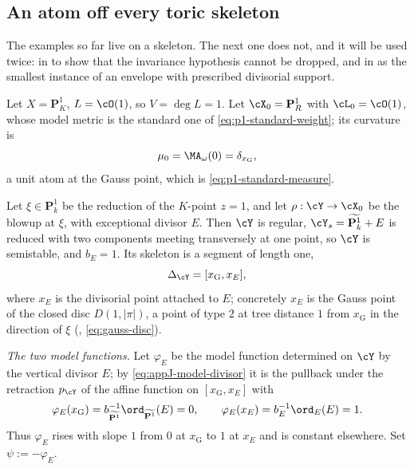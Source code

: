 \subsection{An atom off every toric skeleton}
\label{sec:ch31-p1-blowup}

The examples so far live on a skeleton.  The next one does not, and it will
be used twice: in  to show that the invariance
hypothesis cannot be dropped, and in  as the
smallest instance of an envelope with prescribed divisorial support.

\begin{example}
\label{ex:ch31-p1-blowup}
Let \(X=\mathbf P^1_K\), \(L=\cO(1)\), so \(V=\deg L=1\).  Let
\(\cX_0=\mathbf P^1_R\) with \(\cL_0=\cO(1)\), whose model metric is the
standard one of \eqref{eq:p1-standard-weight}; its curvature is
\begin{equation}
\label{eq:ch31-p1-reference}
 \mu_0=\MA_\omega(0)=\delta_{x_{\mathrm G}},
\end{equation}
a unit atom at the Gauss point, which is \eqref{eq:p1-standard-measure}.

Let \(\xi\in\mathbf P^1_k\) be the reduction of the \(K\)-point \(z=1\), and
let \(\rho:\cY\to\cX_0\) be the blowup at \(\xi\), with exceptional divisor
\(E\).  Then \(\cY\) is regular, \(\cY_s=\widetilde{\mathbf P^1_k}+E\) is
reduced with two components meeting transversely at one point, so \(\cY\) is
semistable, and \(b_E=1\).  Its skeleton is a segment of length one,
\[
 \Delta_{\cY}=[x_{\mathrm G},x_E],
\]
where \(x_E\) is the divisorial point attached to \(E\); concretely
\(x_E\) is the Gauss point of the closed disc
\(D(1,|\pi|)\), a point of type \(2\) at tree distance \(1\) from
\(x_{\mathrm G}\) in the direction of \(\xi\)
(, \eqref{eq:gauss-disc}).

\emph{The two model functions.}  Let \(\varphi_E\) be the model function
determined on \(\cY\) by the vertical divisor \(E\); by
\eqref{eq:appJ-model-divisor} it is the pullback under the retraction
\(p_{\cY}\) of the affine function on \([x_{\mathrm G},x_E]\) with
\[
 \varphi_E(x_{\mathrm G})=b_{\widetilde{\mathbf P^1}}^{-1}
   \ord_{\widetilde{\mathbf P^1}}(E)=0,
 \qquad
 \varphi_E(x_E)=b_E^{-1}\ord_E(E)=1 .
\]
Thus \(\varphi_E\) rises with slope \(1\) from \(0\) at \(x_{\mathrm G}\) to
\(1\) at \(x_E\) and is constant elsewhere.  Set \(\psi:=-\varphi_E\).


\end{example}
